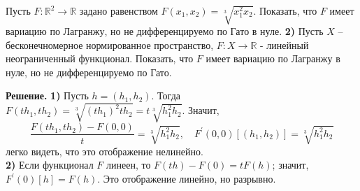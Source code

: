 \begin{task}
    Пусть $F: \mathbb{R}^2 \rightarrow \mathbb{R}$ задано равенством $F\left(x_1, x_2\right)=\sqrt[3]{x_1^2 x_2}$. Показать, что $F$ имеет вариацию по Лагранжу, но не дифференцируемо по Гато в нуле. \textbf{2)} Пусть $X$ -- бесконечномерное нормированное пространство, $F: X \rightarrow \mathbb{R}$ - линейный неограниченный функционал. Показать, что $F$ имеет вариацию по Лагранжу в нуле, но не дифференцируемо по Гато.
    
    \textbf{Решение.} \textbf{1)} Пусть $h = \left( h_1, h_2 \right)$. Тогда $F\left(t h_1, t h_2\right)=\sqrt[3]{\left(t h_1\right)^2 t h_2}=t \sqrt[3]{h_1^2 h_2}$. Значит,
    $$
    \frac{F\left(t h_1, t h_2\right)-F(0,0)}{t}=\sqrt[3]{h_1^2 h_2}, \quad F^{\prime}(0,0)\left[\left(h_1, h_2\right)\right]=\sqrt[3]{h_1^2 h_2}
    $$ 
    легко видеть, что это отображение нелинейно.\\
    \textbf{2)} Если функционал $F$ линеен, то $F(t h)-F(0)=t F(h)$; значит, $F^{\prime}(0)[h]=F(h)$. Это отображение линейно, но разрывно.
    
    \end{task}